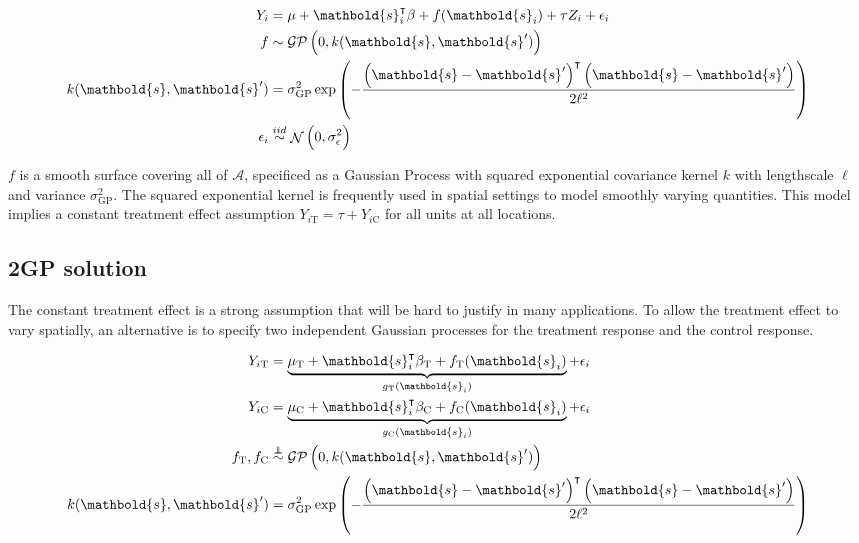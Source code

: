 \documentclass[letter]{article}
\DeclareMathOperator{\normal}{\mathcal{N}}
\newcommand{\gp}{\mathcal{GP}}
\newcommand{\trans}{^{\intercal}}
\newcommand{\area}{\mathcal{A}}
\newcommand{\treat}{\mathrm{T}}
\newcommand{\ctrol}{\mathrm{C}}
\newcommand{\treatind}{Z}
\newcommand{\sigmaf}{\sigma_{\mathrm{GP}}}
\newcommand{\svec}{\mathbold{s}}
\newcommand{\indep}{\protect\mathpalette{\protect\independenT}{\perp}}
\def\independenT#1#2{\mathrel{\rlap{$#1#2$}\mkern2mu{#1#2}}}
\newcommand{\iid}{iid}
\newcommand{\eqlabel}[1]{\label{#1}}
\begin{document}
\begin{equation}\begin{split}
Y_i &= \mu+\svec_i\trans\beta + f(\svec_i) + \tau \treatind_i + \epsilon_i \\
f &\sim \gp\del{0, k(\svec, \svec')} \\
k(\svec,\svec') &= \sigmaf^2 \exp\del{ - \frac{\del{\svec-\svec'}\trans\del{\svec-\svec'}}{2 \ell^2}} \\
\epsilon_i &\overset{\iid}{\sim} \normal\del{0,\sigma_\epsilon^2}
\end{split}\end{equation}

\(f\) is a smooth surface covering all of \(\area\), specificed as a Gaussian Process with squared exponential covariance kernel \(k\) with lengthscale \(\ell\) and variance \(\sigmaf^2\).
The squared exponential kernel is frequently used in spatial settings to model smoothly varying quantities.
This model implies a constant treatment effect assumption \(Y_{i\treat} = \tau + Y_{i\ctrol}\) for all units at all locations.
    


    	\subsection{2GP solution}\label{gp-solution}
    

\label{sec:twogp}
    	The constant treatment effect is a strong assumption that will be hard to justify in many applications. To allow the treatment effect to vary spatially, an alternative is to specify two independent Gaussian processes for the treatment response and the control response.

\begin{equation}
\begin{split}
Y_{i\treat} &= \underbrace{\mu_\treat{} + \svec_i\trans\beta_\treat{} + f_\treat{}(\svec_i)}_{g_\treat{}(\svec_i)} + \epsilon_i \\
Y_{i\ctrol} &= \underbrace{\mu_\ctrol{} + \svec_i\trans\beta_\ctrol{} + f_\ctrol{}(\svec_i)}_{g_\ctrol{}(\svec_i)} + \epsilon_i \\
f_\treat{}, f_\ctrol{} &\overset{\indep}{\sim} \gp\del{0, k(\svec, \svec')} \\
k(\svec,\svec') &= \sigmaf^2 \exp\del{ - \frac{\del{\svec-\svec'}\trans\del{\svec-\svec'}}{2 \ell^2}}
\end{split}
\eqlabel{eq:spec2gp}
\end{equation}
\end{document}
